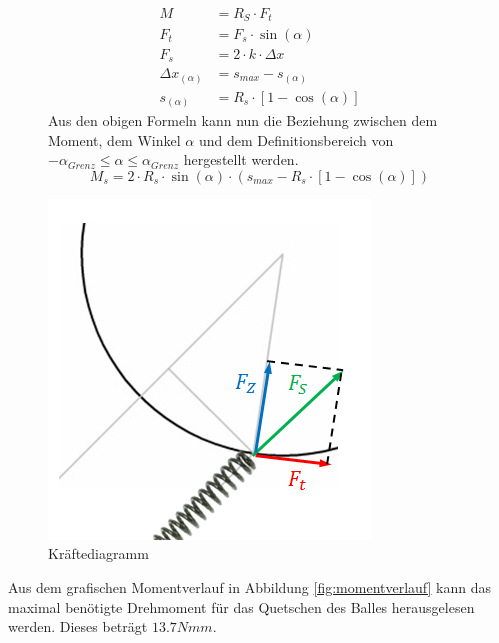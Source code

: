 \begin{figure}[h!]
    \begin{minipage}[hbt]{0.6\textwidth}
    	\begin{align}  
    	    M &= R_S \cdot F_t \\
    	    F_t &= F_s \cdot \sin(\alpha) \\ 
    	    F_s &= 2\cdot k \cdot \Delta x \\
    	    \Delta x_{(\alpha)} &= s_{max} - s_{(\alpha)} \\
    	    s_{(\alpha)} &= R_s \cdot \left[1 - \cos(\alpha)\right]
    	\end{align}
    	Aus den obigen Formeln kann nun die Beziehung zwischen dem Moment, dem Winkel 
    	$\alpha$ und dem Definitionsbereich von $-\alpha_{Grenz} \leq \alpha \leq  
    	\alpha_{Grenz}$ hergestellt werden.    	
    	\begin{equation}  
    	    M_s = 2 \cdot R_s \cdot \sin(\alpha) \cdot \left(s_{max} - R_s \cdot \left[1 - 
    	    \cos(\alpha)\right]\right)
    	\end{equation}
    \end{minipage}
\hfill
    \begin{minipage}[hbt]{0.45\textwidth}
        \includegraphics[scale=0.7,clip,trim=18mm 10mm 8mm 19mm]
        {Enddokumentation/Anhang/Bilder/Kraeftediagramm.jpg}
        \centering
        \caption{Kräftediagramm}
        \label{abb:Kraeftediagramm}
    \end{minipage}
\end{figure}
\vspace{1pt}
Aus dem grafischen Momentverlauf in Abbildung \ref{fig:momentverlauf} kann das maximal 
benötigte Drehmoment für das Quetschen des Balles herausgelesen werden. Dieses beträgt 
$13.7 Nmm$.

